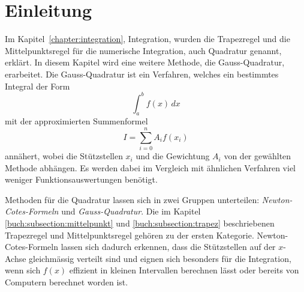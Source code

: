 %
%
%
\section{Einleitung\label{quadratur:section:einleitung}}

Im Kapitel~\ref{chapter:integration}, Integration, wurden die 
Trapezregel und die Mittelpunktsregel für die numerische Integration, 
%
%
auch Quadratur genannt, erklärt. 
%
In diesem Kapitel wird eine weitere Methode, die Gauss-Quadratur, erarbeitet.
Die Gauss-Quadratur ist ein Verfahren, welches ein bestimmtes Integral der Form
%
\begin{equation}
    \int_{a}^{b} f(x) \,dx
\end{equation}
mit der approximierten Summenformel
\begin{equation} \label{quadratur:equation:quadraturapproxsumme}
    I = \sum_{i=0}^{n} A_i f(x_i)
\end{equation}
annähert, wobei die Stützstellen $x_i$ und die Gewichtung $A_i$ von der gewählten 
Methode abhängen. 
Es werden dabei im Vergleich mit ähnlichen Verfahren viel weniger Funktionsauswertungen benötigt.

Methoden für die Quadratur lassen sich in zwei Gruppen unterteilen: 
{\em Newton-Cotes-Formeln} und {\em Gauss-Quadratur}.
Die im Kapitel \ref{buch:subsection:mittelpunkt} und \ref{buch:subsection:trapez} beschriebenen
Trapezregel und Mittelpunktsregel gehören zu der ersten Kategorie.
%
%
Newton-Cotes-Formeln lassen sich dadurch erkennen, dass die Stützstellen auf der $x$-Achse 
gleichmässig verteilt sind und eignen sich besonders für die Integration, wenn sich $f(x)$ 
effizient in kleinen Intervallen berechnen lässt oder bereits von Computern berechnet worden ist.







